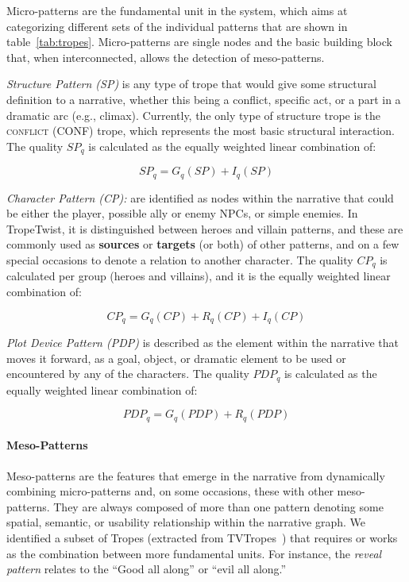 Micro-patterns are the fundamental unit in the system, which aims at categorizing different sets of the individual patterns that are shown in table~\ref{tab:tropes}. Micro-patterns are single nodes and the basic building block that, when interconnected, allows the detection of meso-patterns.

\emph{Structure Pattern (SP)} is any type of trope that would give some structural definition to a narrative, whether this being a conflict, specific act, or a part in a dramatic arc (e.g., climax). Currently, the only type of structure trope is the \textsc{conflict} (CONF) trope, which represents the most basic structural interaction. The quality $SP_{q}$ is calculated as the equally weighted linear combination of:

\begin{equation}
    SP_{q} = G_{q}(SP) + I_{q}(SP)
\end{equation}

\emph{Character Pattern (CP):} are identified as nodes within the narrative that could be either the player, possible ally or enemy NPCs, or simple enemies. In TropeTwist, it is distinguished between heroes and villain patterns, and these are commonly used as \textbf{sources} or \textbf{targets} (or both) of other patterns, and on a few special occasions to denote a relation to another character. The quality $CP_{q}$ is calculated per group (heroes and villains), and it is the equally weighted linear combination of:

\begin{equation}
    CP_{q} = G_{q}(CP) + R_{q}(CP) + I_{q}(CP)
\end{equation}

\emph{Plot Device Pattern (PDP)} is described as the element within the narrative that moves it forward, as a goal, object, or dramatic element to be used or encountered by any of the characters. The quality $PDP_{q}$ is calculated as the equally weighted linear combination of:

\begin{equation}
    PDP_{q} = G_{q}(PDP) + R_{q}(PDP)
\end{equation}


\paragraph{Meso-Patterns}
Meso-patterns are the features that emerge in the narrative from dynamically combining micro-patterns and, on some occasions, these with other meso-patterns. They are always composed of more than one pattern denoting some spatial, semantic, or usability relationship within the narrative graph. We identified a subset of Tropes (extracted from TVTropes~\cite{p12tvtropes}) that requires or works as the combination between more fundamental units. For instance, the \textit{reveal pattern} relates to the ``Good all along'' or ``evil all along.''

